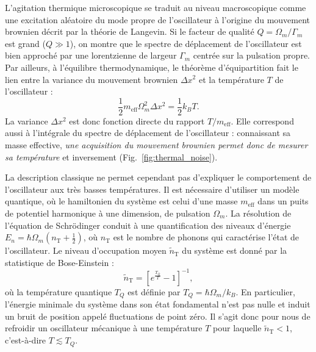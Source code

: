 \documentclass[12pt,a4paper]{article}
\begin{document}
L'agitation thermique microscopique se traduit au niveau macroscopique comme une excitation aléatoire du mode propre de l'oscillateur à l'origine du mouvement brownien décrit par la théorie de Langevin.
Si le facteur de qualité $Q=\Omega_m/\Gamma_m$ est grand ($Q \gg 1$), on montre que le spectre de déplacement de l'oscillateur est bien approché par une lorentzienne de largeur $\Gamma_m$ centrée sur la pulsation propre.
Par ailleurs, à l'équilibre thermodynamique, le théorème d'équipartition fait le lien entre la variance du mouvement brownien $\Delta x^2$ et la température $T$ de l'oscillateur :
\begin{equation}
\frac{1}{2}m_\mathrm{eff}\Omega_m^2\Delta x^2 = \frac{1}{2} k_B T.
\end{equation}
La variance $\Delta x^2$ est donc fonction directe du rapport $T/m_\mathrm{eff}$.
Elle correspond aussi à l'intégrale du spectre de déplacement de l'oscillateur : connaissant sa masse effective, \textit{une acquisition du mouvement brownien permet donc de mesurer sa température} et inversement (Fig.~\ref{fig:thermal_noise}).

La description classique ne permet cependant pas d'expliquer le comportement de l'oscillateur aux très basses températures.
Il est nécessaire d'utiliser un modèle quantique, où le hamiltonien du système est celui d'une masse $m_\mathrm{eff}$ dans un puits de potentiel harmonique à une dimension, de pulsation $\Omega_m$.
La résolution de l'équation de Schrödinger conduit à une quantification des niveaux d'énergie $E_n = \hbar\Omega_m (n_\mathrm{T}+\frac{1}{2})$, où $n_\mathrm{T}$ est le nombre de phonons qui caractérise l'état de l'oscillateur.
Le niveau d'occupation moyen $\tilde{n}_\mathrm{T}$ du système est donné par la statistique de Bose-Einstein :
\begin{equation}
\tilde{n}_\mathrm{T} = \left[ e^\frac{T_Q}{T} -1\right]^{-1},
\label{eq:phonon_number}
\end{equation}
où la température quantique $T_Q$ est définie par $T_Q = \hbar\Omega_m/k_B$.
En particulier, l'énergie minimale du système dans son état fondamental n'est pas nulle et induit un bruit de position appelé \og fluctuations de point zéro\fg{}.
Il s'agit donc pour nous de refroidir un oscillateur mécanique à une température $T$ pour laquelle $\tilde{n}_\mathrm{T} < 1$, c'est-à-dire $T \lesssim T_Q$.
\end{document}
